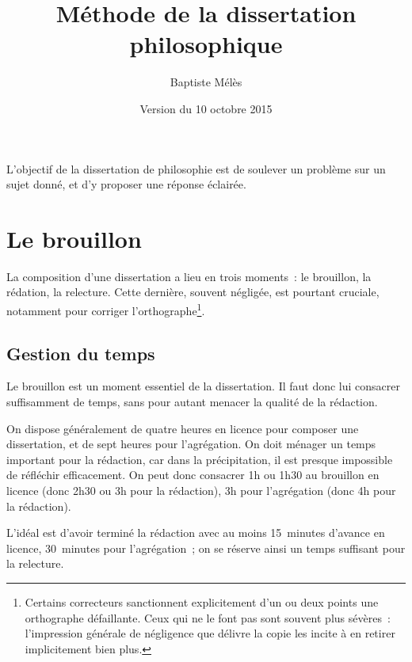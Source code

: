 \documentclass[a4paper,11pt]{article}
\author{Baptiste Mélès}
\title{Méthode de la dissertation philosophique}
\date{Version du 10 octobre 2015}
\begin{document}
\maketitle

L'objectif de la dissertation de philosophie est de soulever un problème
sur un sujet donné, et d'y proposer une réponse éclairée.


\tableofcontents

\par




\section{Le brouillon}

La composition d'une dissertation a lieu en trois moments~: le
brouillon, la rédation, la relecture. Cette dernière, souvent négligée,
est pourtant cruciale, notamment pour corriger
l'orthographe\footnote{Certains correcteurs sanctionnent explicitement
  d'un ou deux points une orthographe défaillante. Ceux qui ne le font
  pas sont souvent plus sévères~: l'impression générale de négligence
  que délivre la copie les incite à en retirer implicitement bien
  plus.}.

\par

\subsection{Gestion du temps}

Le brouillon est un moment essentiel de la dissertation. Il faut donc
lui consacrer suffisamment de temps, sans pour autant menacer la qualité
de la rédaction.

\par

On dispose généralement de quatre heures en licence pour composer une
dissertation, et de sept heures pour l'agrégation. On doit ménager un
temps important pour la rédaction, car dans la précipitation, il est
presque impossible de réfléchir efficacement. On peut donc consacrer 1h
ou 1h30 au brouillon en licence (donc 2h30 ou 3h pour la rédaction), 3h
pour l'agrégation (donc 4h pour la rédaction).

\par

L'idéal est d'avoir terminé la rédaction avec au moins 15~minutes
d'avance en licence, 30~minutes pour l'agrégation~; on se réserve ainsi
un temps suffisant pour la relecture.
\end{document}
